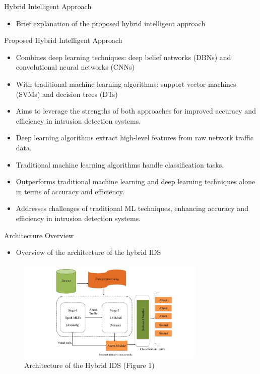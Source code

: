\documentclass{beamer}
\begin{document}
\begin{frame}{Hybrid Intelligent Approach}
  \begin{itemize}
    \item Brief explanation of the proposed hybrid intelligent approach
  \end{itemize}

  \begin{block}{Proposed Hybrid Intelligent Approach}
    \begin{itemize}
      \item Combines deep learning techniques: deep belief networks (DBNs) and convolutional neural networks (CNNs)
      \item With traditional machine learning algorithms: support vector machines (SVMs) and decision trees (DTs)
      \item Aims to leverage the strengths of both approaches for improved accuracy and efficiency in intrusion detection systems.
    \end{itemize}
  \end{block}

  \begin{itemize}
    \item Deep learning algorithms extract high-level features from raw network traffic data.
    \item Traditional machine learning algorithms handle classification tasks.
    \item Outperforms traditional machine learning and deep learning techniques alone in terms of accuracy and efficiency.
    \item Addresses challenges of traditional ML techniques, enhancing accuracy and efficiency in intrusion detection systems.
  \end{itemize}
\end{frame}


\begin{frame}{Architecture Overview}
  \begin{itemize}
    \item Overview of the architecture of the hybrid IDS
  \end{itemize}

  \begin{figure}
    \centering
    \includegraphics[width=0.8\textwidth]{Figure 1.PNG}
    \caption{Architecture of the Hybrid IDS (Figure 1)}
  \end{figure}
    
\end{frame}
\end{document}
